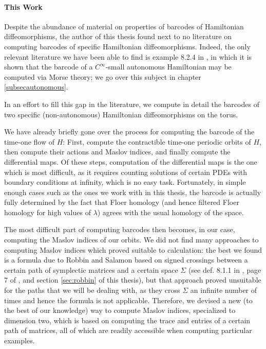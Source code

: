 \paragraph{This Work}

Despite the abundance of material on properties of barcodes of Hamiltonian diffeomorphisms, the author of this thesis found next to no literature on computing barcodes of specific Hamiltonian diffeomorphisms. Indeed, the only relevant literature we have been able to find is example 8.2.4 in \cite{polterovich}, in which it is shown that the barcode of a $C^\infty$-small autonomous Hamiltonian may be computed via Morse theory; we go over this subject in chapter \ref{subsecautonomous}.

In an effort to fill this gap in the literature, we compute in detail the barcodes of two specific (non-autonomous) Hamiltonian diffeomorphisms on the torus.

We have already briefly gone over the process for computing the barcode of the time-one flow of $H$: First, compute the contractible time-one periodic orbits of $H$, then compute their actions and Maslov indices, and finally compute the differential maps. Of these steps, computation of the differential maps is the one which is most difficult, as it requires counting solutions of certain PDEs with boundary conditions at infinity, which is no easy task. Fortunately, in simple enough cases such as the ones we work with in this thesis, the barcode is actually fully determined by the fact that Floer homology (and hence filtered Floer homology for high values of $\lambda$) agrees with the usual homology of the space.

The most difficult part of computing barcodes then becomes, in our case, computing the Maslov indices of our orbits. We did not find many approaches to computing Maslov indices which proved suitable to calculation: the best we found is a formula due to Robbin and Salamon \cite{robbin1993maslov} based on signed crossings between a certain path of symplectic matrices and a certain space $\Sigma$ (see def. 8.1.1 in \cite{polterovich}, page 7 of \cite{robbin1993maslov}, and section \ref{sec:robbin} of this thesis), but that approach proved unsuitable for the paths that we will be dealing with, as they cross $\Sigma$ an infinite number of times and hence the formula is not applicable. Therefore, we devised a new (to the best of our knowledge) way to compute Maslov indices, specialized to dimension two, which is based on computing the trace and entries of a certain path of matrices, all of which are readily accessible when computing particular examples.

